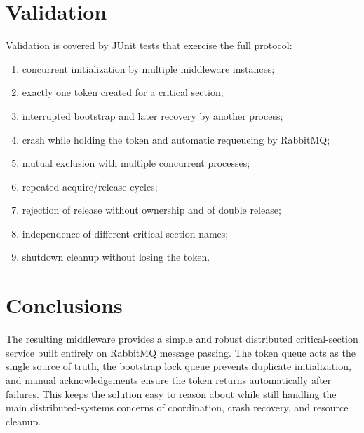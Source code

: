 \documentclass[11pt,a4paper]{article}
\begin{document}
\section{Validation}
Validation is covered by JUnit tests that exercise the full protocol:
\begin{enumerate}
    \item concurrent initialization by multiple middleware instances;
    \item exactly one token created for a critical section;
    \item interrupted bootstrap and later recovery by another process;
    \item crash while holding the token and automatic requeueing by RabbitMQ;
    \item mutual exclusion with multiple concurrent processes;
    \item repeated acquire/release cycles;
    \item rejection of release without ownership and of double release;
    \item independence of different critical-section names;
    \item shutdown cleanup without losing the token.
\end{enumerate}

\section{Conclusions}
The resulting middleware provides a simple and robust distributed critical-section service built entirely on
RabbitMQ message passing. The token queue acts as the single source of truth, the bootstrap lock queue prevents
duplicate initialization, and manual acknowledgements ensure the token returns automatically after failures.
This keeps the solution easy to reason about while still handling the main distributed-systems concerns of
coordination, crash recovery, and resource cleanup.
\end{document}
